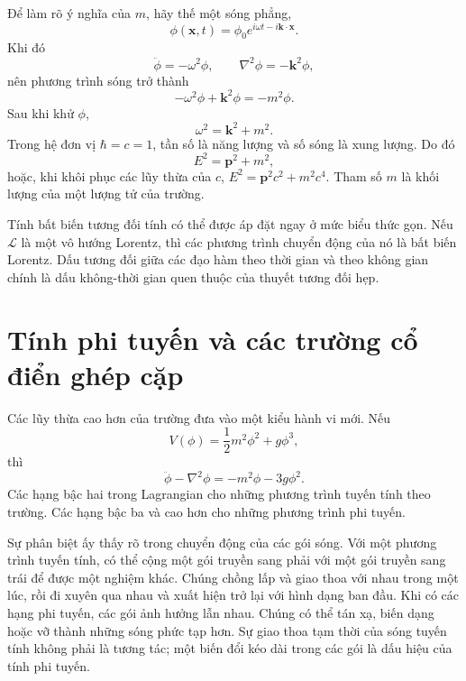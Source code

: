 Để làm rõ ý nghĩa của \(m\), hãy thế một sóng phẳng,
\begin{equation}
\phi(\mathbf x,t)=\phi_0e^{i\omega t-i\mathbf k\cdot\mathbf x}.
\end{equation}
Khi đó
\begin{equation}
\ddot\phi=-\omega^2\phi,
\qquad
\nabla^2\phi=-\mathbf k^2\phi,
\end{equation}
nên phương trình sóng trở thành
\begin{equation}
-\omega^2\phi+\mathbf k^2\phi=-m^2\phi.
\end{equation}
Sau khi khử \(\phi\),
\begin{equation}
\omega^2=\mathbf k^2+m^2.
\end{equation}
Trong hệ đơn vị \(\hbar=c=1\), tần số là năng lượng và số sóng là xung lượng. Do đó
\begin{equation}
E^2=\mathbf p^2+m^2,
\end{equation}
hoặc, khi khôi phục các lũy thừa của \(c\), \(E^2=\mathbf p^2c^2+m^2c^4\). Tham số \(m\) là khối lượng của một lượng tử của trường.

Tính bất biến tương đối tính có thể được áp đặt ngay ở mức biểu thức gọn. Nếu \(\mathcal L\) là một vô hướng Lorentz, thì các phương trình chuyển động của nó là bất biến Lorentz. Dấu tương đối giữa các đạo hàm theo thời gian và theo không gian chính là dấu không-thời gian quen thuộc của thuyết tương đối hẹp.

\section{Tính phi tuyến và các trường cổ điển ghép cặp}

Các lũy thừa cao hơn của trường đưa vào một kiểu hành vi mới. Nếu
\begin{equation}
V(\phi)=\frac12m^2\phi^2+g\phi^3,
\end{equation}
thì
\begin{equation}
\ddot\phi-\nabla^2\phi=-m^2\phi-3g\phi^2.
\end{equation}
Các hạng bậc hai trong Lagrangian cho những phương trình tuyến tính theo trường. Các hạng bậc ba và cao hơn cho những phương trình phi tuyến.

Sự phân biệt ấy thấy rõ trong chuyển động của các gói sóng. Với một phương trình tuyến tính, có thể cộng một gói truyền sang phải với một gói truyền sang trái để được một nghiệm khác. Chúng chồng lấp và giao thoa với nhau trong một lúc, rồi đi xuyên qua nhau và xuất hiện trở lại với hình dạng ban đầu. Khi có các hạng phi tuyến, các gói ảnh hưởng lẫn nhau. Chúng có thể tán xạ, biến dạng hoặc vỡ thành những sóng phức tạp hơn. Sự giao thoa tạm thời của sóng tuyến tính không phải là tương tác; một biến đổi kéo dài trong các gói là dấu hiệu của tính phi tuyến.

